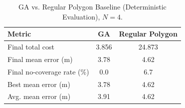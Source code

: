 \begin{table}[t]
\centering
\caption{GA vs. Regular Polygon Baseline (Deterministic Evaluation), $N=4$.}
\label{tab:ga_vs_polygon_n4}
\begin{tabular}{lcc}
\hline
Metric & GA & Regular Polygon \\
\hline
Final total cost & 3.856 & 24.873 \\
Final mean error (m) & 3.78 & 4.62 \\
Final no-coverage rate (\%) & 0.0 & 6.7 \\
Best mean error (m) & 3.78 & 4.62 \\
Avg. mean error (m) & 3.91 & 4.62 \\
\hline
\end{tabular}
\end{table}